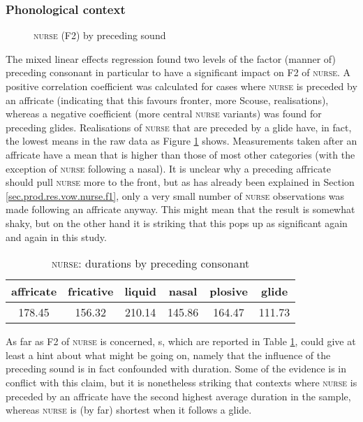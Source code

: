 \subsubsection{Phonological context}
\label{sec.prod.res.vow.nurse.f2.phon}

\begin{figure}[h!]
	\centering
		\resizebox{0.5\linewidth}{!}{} 
	\caption{\textsc{nurse} (F2) by preceding sound}
	\label{fig.box.f2w.nurse.presound}
\end{figure}

The mixed linear effects regression found two levels of the factor (manner of) preceding consonant in particular to have a significant impact on F2 of \textsc{nurse}.
A positive correlation coefficient was calculated for cases where \textsc{nurse} is preceded by an affricate (indicating that this  favours fronter, more Scouse, realisations), whereas a negative coefficient (more central \textsc{nurse} variants) was found for preceding glides.
Realisations of \textsc{nurse} that are preceded by a glide have, in fact, the lowest means in the raw data as Figure \ref{fig.box.f2w.nurse.presound} shows.
Measurements taken after an affricate have a mean that is higher than those of most other categories (with the exception of \textsc{nurse} following a nasal).
It is unclear why a preceding affricate should pull \textsc{nurse} more to the front, but as has already been explained in Section \ref{sec.prod.res.vow.nurse.f1}, only a very small number of \textsc{nurse} observations was made following an affricate anyway.
This might mean that the result is somewhat shaky, but on the other hand it is striking that this  pops up as significant again and again in this study.

\begin{table}[h!]
	\centering
	\caption{\textsc{nurse}: durations by preceding consonant}
	\label{tab.dur.phon.nurse}
	\begin{tabular}{cccccc}
		\hline
		affricate & fricative & liquid & nasal & plosive & glide\\
		\hline
		178.45 & 156.32 & 210.14 & 145.86 & 164.47 & 111.73\\
		\hline
	\end{tabular}
\end{table}

As far as F2 of \textsc{nurse} is concerned, s, which are reported in Table \ref{tab.dur.phon.nurse}, could give at least a hint about what might be going on, namely that the influence of the preceding sound is in fact confounded with duration.
Some of the evidence is in conflict with this claim, but it is nonetheless striking that contexts where \textsc{nurse} is preceded by an affricate have the second highest average duration in the sample, whereas \textsc{nurse} is (by far) shortest when it follows a glide.

